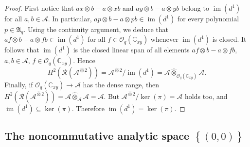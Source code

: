 \documentclass[12pt,reqno]{amsart}%
\theoremstyle{plain}
\numberwithin{theorem}{section} \numberwithin{equation}{section}
\numberwithin{lemma}{section}
\numberwithin{remark}{section}
\numberwithin{example}{section}
\numberwithin{proposition}{section}
\numberwithin{definition}{section}
\numberwithin{corollary}{section}
\begin{document}
\begin{proof}
First notice that $ax\otimes b-a\otimes xb$ and $ay\otimes b-a\otimes yb$
belong to $\operatorname{im}\left(  d^{1}\right)  $ for all $a,b\in
\mathcal{A}$. In particular, $ap\otimes b-a\otimes pb\in\operatorname{im}%
\left(  d^{1}\right)  $ for every polynomial $p\in\mathfrak{A}_{q}$. Using the
continuity argument, we deduce that $af\otimes b-a\otimes fb\in
\operatorname{im}\left(  d^{1}\right)  $ for all $f\in\mathcal{O}_{q}\left(
\mathbb{C}_{xy}\right)  $ whenever $\operatorname{im}\left(  d^{1}\right)  $
is closed. It follows that $\operatorname{im}\left(  d^{1}\right)  $ is the
closed linear span of all elements $af\otimes b-a\otimes fb$, $a,b\in
\mathcal{A}$, $f\in\mathcal{O}_{q}\left(  \mathbb{C}_{xy}\right)  $. Hence
\[
H^{2}\left(  \mathcal{R}\left(  \mathcal{A}^{\widehat{\otimes}2}\right)
\right)  =\mathcal{A}^{\widehat{\otimes}2}/\operatorname{im}\left(
d^{1}\right)  =\mathcal{A}\widehat{\otimes}_{\mathcal{O}_{q}\left(
\mathbb{C}_{xy}\right)  }\mathcal{A}.
\]
Finally, if $\mathcal{O}_{q}\left(  \mathbb{C}_{xy}\right)  \rightarrow
\mathcal{A}$ has the dense range, then $H^{2}\left(  \mathcal{R}\left(
\mathcal{A}^{\widehat{\otimes}2}\right)  \right)  =\mathcal{A}\widehat{\otimes
}_{\mathcal{A}}\mathcal{A=A}$. But $\mathcal{A}^{\widehat{\otimes}2}%
/\ker\left(  \pi\right)  =\mathcal{A}$ holds too, and $\operatorname{im}%
\left(  d^{1}\right)  \subseteq\ker\left(  \pi\right)  $. Therefore
$\operatorname{im}\left(  d^{1}\right)  =\ker\left(  \pi\right)  $.
\end{proof}

\subsection{The noncommutative analytic space $\left\{  \left(  0,0\right)
\right\}  $\label{subsecFQM}}
\end{document}
